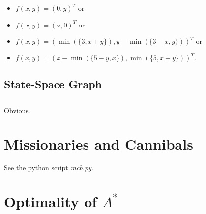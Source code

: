 \documentclass[11pt,a4paper]{scrartcl}
\begin{document}
\begin{itemize}
\item $f(x,y) = (0,y)^T$ or
\item $f(x,y) = (x,0)^T$ or 
\item $f(x,y) = (\min(\{3, x+y\}), y-\min(\{3-x,y\}))^T$ or
\item $f(x,y) = (x-\min(\{5-y,x\}), \min(\{5,x+y\}))^T$.
\end{itemize}

\subsection{State-Space Graph}

\subsection{}
Obvious.

\section{Missionaries and Cannibals}

See the python script \emph{mcb.py}. 

\section{Optimality of $A^*$}
\end{document}
